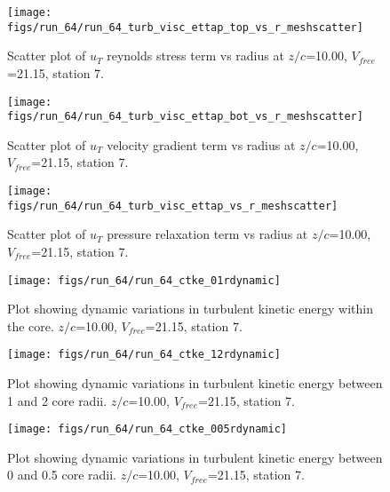 \begin{figure}[H]
\centering
\texttt{[image: figs/run\_64/run\_64\_turb\_visc\_ettap\_top\_vs\_r\_meshscatter]}
\caption{Scatter plot of $
u_T$ reynolds stress term vs radius at $z/c$=10.00, $V_{free}$=21.15, station 7.}
\label{fig:run_64_turb_visc_ettap_top_vs_r_meshscatter}
\end{figure}


\begin{figure}[H]
\centering
\texttt{[image: figs/run\_64/run\_64\_turb\_visc\_ettap\_bot\_vs\_r\_meshscatter]}
\caption{Scatter plot of $
u_T$ velocity gradient term vs radius at $z/c$=10.00, $V_{free}$=21.15, station 7.}
\label{fig:run_64_turb_visc_ettap_bot_vs_r_meshscatter}
\end{figure}


\begin{figure}[H]
\centering
\texttt{[image: figs/run\_64/run\_64\_turb\_visc\_ettap\_vs\_r\_meshscatter]}
\caption{Scatter plot of $
u_T$ pressure relaxation term vs radius at $z/c$=10.00, $V_{free}$=21.15, station 7.}
\label{fig:run_64_turb_visc_ettap_vs_r_meshscatter}
\end{figure}


\begin{figure}[H]
\centering
\texttt{[image: figs/run\_64/run\_64\_ctke\_01rdynamic]}
\caption{Plot showing dynamic variations in turbulent kinetic energy within the core. $z/c$=10.00, $V_{free}$=21.15, station 7.}
\label{fig:run_64_ctke_01rdynamic}
\end{figure}


\begin{figure}[H]
\centering
\texttt{[image: figs/run\_64/run\_64\_ctke\_12rdynamic]}
\caption{Plot showing dynamic variations in turbulent kinetic energy between 1 and 2 core radii. $z/c$=10.00, $V_{free}$=21.15, station 7.}
\label{fig:run_64_ctke_12rdynamic}
\end{figure}


\begin{figure}[H]
\centering
\texttt{[image: figs/run\_64/run\_64\_ctke\_005rdynamic]}
\caption{Plot showing dynamic variations in turbulent kinetic energy between 0 and 0.5 core radii. $z/c$=10.00, $V_{free}$=21.15, station 7.}
\label{fig:run_64_ctke_005rdynamic}
\end{figure}


